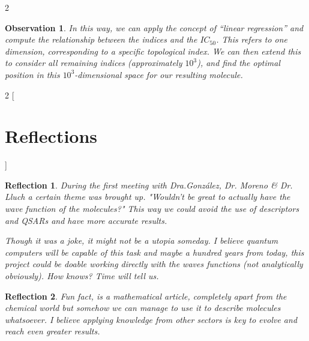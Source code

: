 \documentclass[12pt,letterpaper]{article}
\newtheorem{observation}{Observation}
\newtheorem{reflection}{Reflection}
\begin{document}
\begin{multicols}{2}
\begin{observation}
In this way, we can apply the concept of “linear regression” and compute the relationship between the indices and the $IC_{50}$. This refers to one dimension, corresponding to a specific topological index. We can then extend this to consider all remaining indices (approximately $10^3$), and find the optimal position in this $10^3$-dimensional space for our resulting molecule.
\end{observation}
\end{multicols}
\newpage


\begin{multicols}{2}
[
\section{Reflections}
]
\begin{reflection}
During the first meeting with Dra.González, Dr. Moreno \& Dr. Lluch a certain theme was brought up. "Wouldn't be great to actually have the wave function of the molecules?" This way we could avoid the use of descriptors and QSARs and have more accurate results. \par
Though it was a joke, it might not be a utopia someday. I believe quantum computers will be capable of this task and maybe a hundred years from today, this project could be doable working directly with the waves functions (not analytically obviously). How knows? Time will tell us.
\end{reflection}
\begin{reflection}
Fun fact, \cite{ZagrebIndicesArticle} is a mathematical article, completely apart from the chemical world but somehow we can manage to use it to describe molecules whatsoever. I believe applying knowledge from other sectors is key to evolve and reach even greater results.
\end{reflection}
\end{multicols}



\newpage



 
\end{document}
